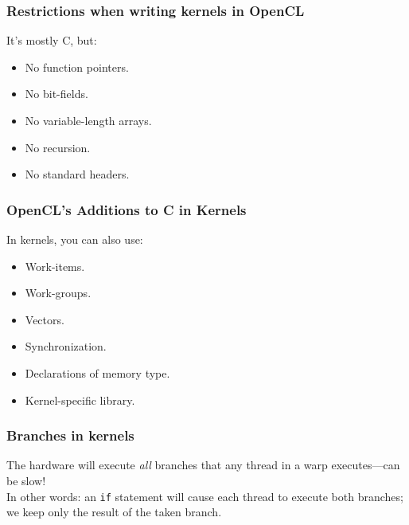 \begin{frame}
  \frametitle{Restrictions when writing kernels in OpenCL}


  It's mostly C, but:
  \begin{itemize}
    \item No function pointers.
    \item No bit-fields.
    \item No variable-length arrays.
    \item No recursion.
    \item No standard headers.
  \end{itemize}

\end{frame}

\begin{frame}
  \frametitle{OpenCL's Additions to C in Kernels}


In kernels, you can also use:
  \begin{itemize}
    \item Work-items.
    \item Work-groups.
    \item Vectors.
    \item Synchronization.
    \item Declarations of memory type.
    \item Kernel-specific library.
  \end{itemize}

\end{frame}

\begin{frame}
  \frametitle{Branches in kernels}


    The hardware will execute \emph{all} branches that any thread in a warp
      executes---can be slow!\\[1em]

    In other words: an {\tt if} statement will cause each thread to execute
      both branches; we keep only the result of the taken branch.\\[1em]


\end{frame}

